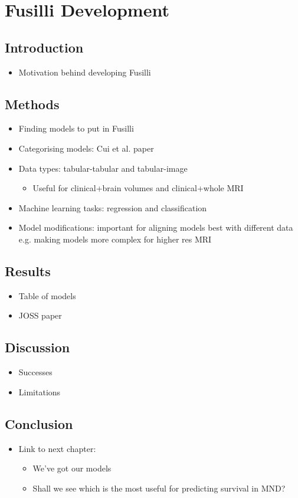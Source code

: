 \chapter{Fusilli Development}
\label{fusilli_development}

\section{Introduction}
\begin{itemize}
    \item Motivation behind developing Fusilli
\end{itemize}

\section{Methods}
\begin{itemize}
    \item Finding models to put in Fusilli
    \item Categorising models: Cui et al. paper
    \item Data types: tabular-tabular and tabular-image
    \begin{itemize}
        \item Useful for clinical+brain volumes and clinical+whole MRI
    \end{itemize}
    \item Machine learning tasks: regression and classification
    \item Model modifications: important for aligning models best with different data e.g. making models more complex for higher res MRI
\end{itemize}

\section{Results}
\begin{itemize}
    \item Table of models
    \item JOSS paper
\end{itemize}

\section{Discussion}
\begin{itemize}
    \item Successes
    \item Limitations
\end{itemize}

\section{Conclusion}
\begin{itemize}
    \item Link to next chapter:
    \begin{itemize}
        \item We've got our models
        \item Shall we see which is the most useful for predicting survival in MND?
    \end{itemize}
\end{itemize}
